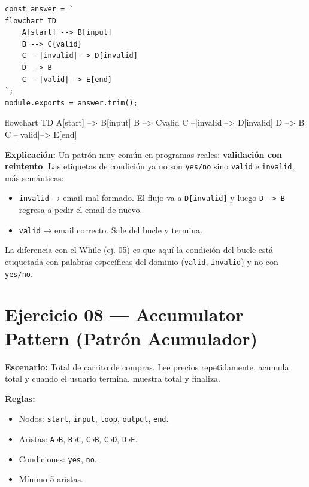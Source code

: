 \documentclass[10pt,a4paper]{article}
\newenvironment{mermaid}[1][]
  {%
   \begin{mdframed}[%
     linecolor=blue!50!black,
     backgroundcolor=blue!3,
     innertopmargin=6pt,
     innerbottommargin=6pt,
     leftmargin=0pt,
     rightmargin=0pt,
     skipabove=10pt,
     skipbelow=10pt,
     frametitle={Diagrama Mermaid},
     frametitlefont={\small\bfseries\color{blue!70!black}},
   ]%
   \small\ttfamily
  }
  {%
   \end{mdframed}%
  }
\begin{document}
\begin{lstlisting}[style=jsstyle]
const answer = `
flowchart TD
    A[start] --> B[input]
    B --> C{valid}
    C --|invalid|--> D[invalid]
    D --> B
    C --|valid|--> E[end]
`;
module.exports = answer.trim();
\end{lstlisting}

\begin{mermaid}
flowchart TD
    A[start] --> B[input]
    B --> C{valid}
    C --|invalid|--> D[invalid]
    D --> B
    C --|valid|--> E[end]
\end{mermaid}

\textbf{Explicación:}
Un patrón muy común en programas reales: \textbf{validación con
reintento}. Las etiquetas de condición ya no son \texttt{yes/no} sino
\texttt{valid} e \texttt{invalid}, más semánticas:
\begin{itemize}
  \item \texttt{invalid} → email mal formado. El flujo va a
        \texttt{D[invalid]} y luego \texttt{D --> B} regresa a pedir
        el email de nuevo.
  \item \texttt{valid} → email correcto. Sale del bucle y termina.
\end{itemize}
La diferencia con el While (ej. 05) es que aquí la condición del bucle
está etiquetada con palabras específicas del dominio (\texttt{valid},
\texttt{invalid}) y no con \texttt{yes/no}.

\newpage

\section{Ejercicio 08 — Accumulator Pattern (Patrón Acumulador)}

\textbf{Escenario:} Total de carrito de compras. Lee precios
repetidamente, acumula total y cuando el usuario termina, muestra total
y finaliza.

\textbf{Reglas:}
\begin{itemize}
  \item Nodos: \texttt{start}, \texttt{input}, \texttt{loop},
        \texttt{output}, \texttt{end}.
  \item Aristas: \texttt{A→B}, \texttt{B→C}, \texttt{C→B},
        \texttt{C→D}, \texttt{D→E}.
  \item Condiciones: \texttt{yes}, \texttt{no}.
  \item Mínimo 5 aristas.
\end{itemize}
\end{document}
